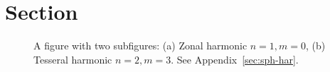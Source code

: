\section{Section}
\lipsum[3]

\begin{figure}[t]
\begin{subfigure}[c]{0.495\textwidth}
%
\subcaption{\label{fig:zonal}}
\end{subfigure}
\begin{subfigure}[c]{0.495\textwidth}
%
\subcaption{\label{fig:tesseral}}%
\end{subfigure}%
\caption{A figure with two subfigures: (a) Zonal harmonic $n=1, m=0$, (b) Tesseral harmonic $n=2, m=3$. See Appendix~\ref{sec:sph-har}.\label{fig:1}}
\end{figure}

